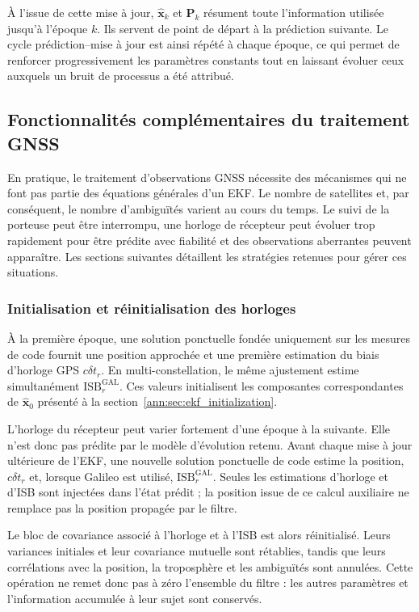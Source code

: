 À l'issue de cette mise à jour, $\widehat{\mathbf x}_k$ et $\mathbf P_k$
résument toute l'information utilisée jusqu'à l'époque $k$. Ils servent de
point de départ à la prédiction suivante. Le cycle prédiction--mise à jour est
ainsi répété à chaque époque, ce qui permet de renforcer progressivement les
paramètres constants tout en laissant évoluer ceux auxquels un bruit de
processus a été attribué.

\subsection{Fonctionnalités complémentaires du traitement GNSS}
\label{ann:sec:ekf_gnss_features}

En pratique, le traitement d'observations GNSS nécessite des mécanismes qui ne
font pas partie des équations générales d'un EKF. Le nombre de satellites et,
par conséquent, le nombre d'ambiguïtés varient au cours du temps. Le suivi de
la porteuse peut être interrompu, une horloge de récepteur peut évoluer trop
rapidement pour être prédite avec fiabilité et des observations aberrantes
peuvent apparaître. Les sections suivantes détaillent les stratégies retenues pour gérer ces situations.

\subsubsection{Initialisation et réinitialisation des horloges}

À la première époque, une solution ponctuelle fondée uniquement sur les
mesures de code fournit une position approchée et une première estimation du
biais d'horloge GPS $c\delta t_r$. En multi-constellation, le même ajustement
estime simultanément $\mathrm{ISB}_r^{\mathrm{GAL}}$. Ces valeurs initialisent
les composantes correspondantes de $\widehat{\mathbf x}_0$ présenté à la
section~\ref{ann:sec:ekf_initialization}.

L'horloge du récepteur peut varier fortement d'une époque à la suivante. Elle
n'est donc pas prédite par le modèle d'évolution retenu. Avant chaque mise à
jour ultérieure de l'EKF, une nouvelle solution ponctuelle de code estime la
position, $c\delta t_r$ et, lorsque Galileo est utilisé,
$\mathrm{ISB}_r^{\mathrm{GAL}}$. Seules les estimations d'horloge et d'ISB sont
injectées dans l'état prédit ; la position issue de ce calcul auxiliaire ne
remplace pas la position propagée par le filtre.

Le bloc de covariance associé à l'horloge et à l'ISB est alors réinitialisé.
Leurs variances initiales et leur covariance mutuelle sont rétablies, tandis
que leurs corrélations avec la position, la troposphère et les ambiguïtés sont
annulées. Cette opération ne remet donc pas à zéro l'ensemble du filtre : les
autres paramètres et l'information accumulée à leur sujet sont conservés.

